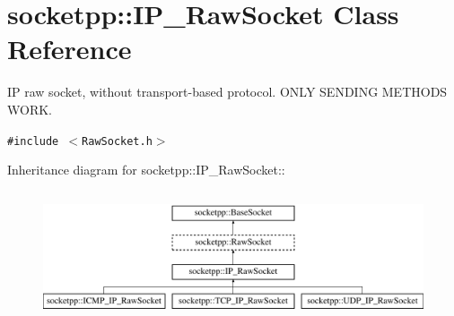 \hypertarget{classsocketpp_1_1IP__RawSocket}{
\section{socketpp::IP\_\-RawSocket Class Reference}
\label{classsocketpp_1_1IP__RawSocket}
}
IP raw socket, without transport-based protocol. ONLY SENDING METHODS WORK.  


{\tt \#include $<$RawSocket.h$>$}

Inheritance diagram for socketpp::IP\_\-RawSocket::\begin{figure}[H]
\begin{center}
\leavevmode
\includegraphics[height=3.8488cm]{classsocketpp_1_1IP__RawSocket}
\end{center}
\end{figure}
